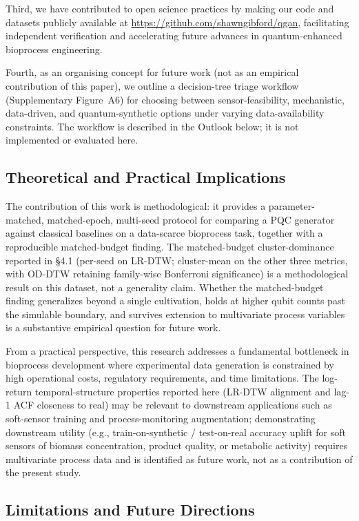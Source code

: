 \documentclass[12pt,twocolumn]{article}
\begin{document}
Third, we have contributed to open science practices by making our code and datasets publicly available at \url{https://github.com/shawngibford/qgan}, facilitating independent verification and accelerating future advances in quantum-enhanced bioprocess engineering.

Fourth, as an organising concept for future work (not as an empirical contribution of this paper), we outline a decision-tree triage workflow (Supplementary Figure~A6) for choosing between sensor-feasibility, mechanistic, data-driven, and quantum-synthetic options under varying data-availability constraints. The workflow is described in the Outlook below; it is not implemented or evaluated here.

\subsection{Theoretical and Practical Implications}

The contribution of this work is methodological: it provides a parameter-matched, matched-epoch, multi-seed protocol for comparing a PQC generator against classical baselines on a data-scarce bioprocess task, together with a reproducible matched-budget finding. The matched-budget cluster-dominance reported in \S 4.1 (per-seed on LR-DTW; cluster-mean on the other three metrics, with OD-DTW retaining family-wise Bonferroni significance) is a methodological result on this dataset, not a generality claim. Whether the matched-budget finding generalizes beyond a single cultivation, holds at higher qubit counts past the simulable boundary, and survives extension to multivariate process variables is a substantive empirical question for future work.

From a practical perspective, this research addresses a fundamental bottleneck in bioprocess development where experimental data generation is constrained by high operational costs, regulatory requirements, and time limitations. The log-return temporal-structure properties reported here (LR-DTW alignment and lag-1 ACF closeness to real) may be relevant to downstream applications such as soft-sensor training and process-monitoring augmentation; demonstrating downstream utility (e.g., train-on-synthetic / test-on-real accuracy uplift for soft sensors of biomass concentration, product quality, or metabolic activity) requires multivariate process data and is identified as future work, not as a contribution of the present study.

\subsection{Limitations and Future Directions}
\end{document}
